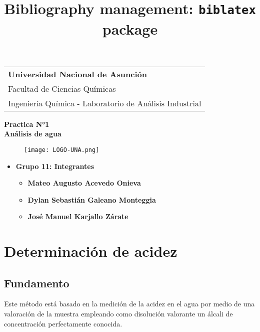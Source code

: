 \documentclass[a4paper,12pt]{article} %
\title{Bibliography management: \texttt{biblatex} package}
\begin{document}
\thispagestyle{empty} 
\begin{tabular}{p{15.5cm}}
{\large \bf Universidad Nacional de Asunción} \\
Facultad de Ciencias Químicas \\ 
Ingeniería Química - Laboratorio de Análisis Industrial \\
\hline
\end{tabular} 

\vspace*{0.3cm} %

\begin{center} 
    {\Large \bf Practica N°1  \\ \vspace{3mm} Análisis de agua}
    \vspace{5mm}
    \begin{figure}[H] 
        \centering
        \texttt{[image: LOGO-UNA.png]}
    \end{figure}
\end{center}  

\vspace{15mm}

\begin{itemize}
    \item \textbf{Grupo 11: Integrantes}
    \begin{itemize}
        \item{\bf Mateo Augusto Acevedo Onieva}
        \item{\bf Dylan Sebastián Galeano Monteggia}
        \item{\bf José Manuel Karjallo Zárate}
    \end{itemize}
\end{itemize}



\newpage

\section{Determinación de acidez}

\subsection{Fundamento} 
Este método está basado en la medición de la acidez en el agua por medio de una valoración de la muestra empleando como disolución valorante un álcali de concentración perfectamente conocida.         
\end{document}
